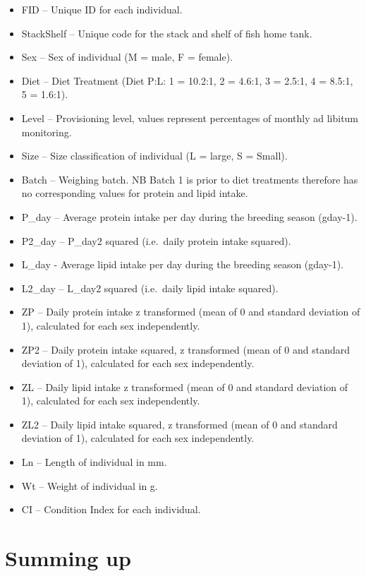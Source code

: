 \documentclass[]{book}
\providecommand{\tightlist}{%
  \setlength{\itemsep}{0pt}\setlength{\parskip}{0pt}}
\begin{document}
\begin{itemize}
\tightlist
\item
  FID -- Unique ID for each individual.
\item
  StackShelf -- Unique code for the stack and shelf of fish home tank.
\item
  Sex -- Sex of individual (M = male, F = female).
\item
  Diet -- Diet Treatment (Diet P:L: 1 = 10.2:1, 2 = 4.6:1, 3 = 2.5:1, 4 = 8.5:1, 5 = 1.6:1).
\item
  Level -- Provisioning level, values represent percentages of monthly ad libitum monitoring.
\item
  Size -- Size classification of individual (L = large, S = Small).
\item
  Batch -- Weighing batch. NB Batch 1 is prior to diet treatments therefore has no corresponding values for protein and lipid intake.
\item
  P\_day -- Average protein intake per day during the breeding season (gday-1).
\item
  P2\_day -- P\_day2 squared (i.e.~daily protein intake squared).
\item
  L\_day - Average lipid intake per day during the breeding season (gday-1).
\item
  L2\_day -- L\_day2 squared (i.e.~daily lipid intake squared).
\item
  ZP -- Daily protein intake z transformed (mean of 0 and standard deviation of 1), calculated for each sex independently.
\item
  ZP2 -- Daily protein intake squared, z transformed (mean of 0 and standard deviation of 1), calculated for each sex independently.
\item
  ZL -- Daily lipid intake z transformed (mean of 0 and standard deviation of 1), calculated for each sex independently.
\item
  ZL2 -- Daily lipid intake squared, z transformed (mean of 0 and standard deviation of 1), calculated for each sex independently.
\item
  Ln -- Length of individual in mm.
\item
  Wt -- Weight of individual in g.
\item
  CI -- Condition Index for each individual.
\end{itemize}

\hypertarget{summing-up}{%
\chapter{Summing up}\label{summing-up}}


\end{document}
